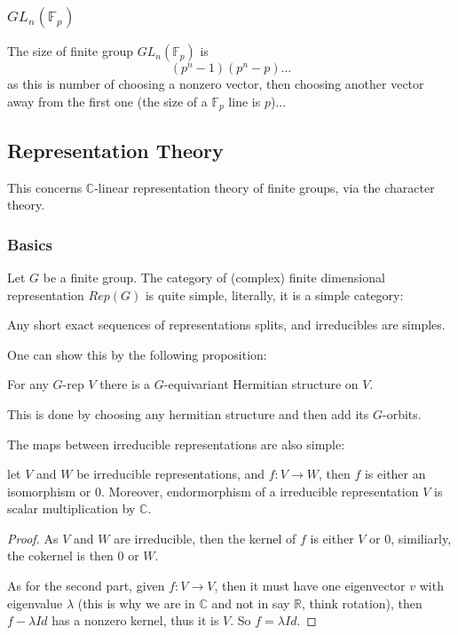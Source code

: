 \documentclass[main.tex]{subfiles}
\begin{document}
\subsubsection{$GL_n(\mathbb{F}_p)$}
The size of finite group $GL_n(\mathbb{F}_p)$ is
$$
(p^n -1) (p^n - p) ...
$$
as this is number of choosing a nonzero vector, then choosing another vector away from the first one (the size of a $\mathbb{F}_p$ line is $p$)...

\subsection{Representation Theory}
This concerns $\mathbb{C}$-linear representation theory of finite groups, via the character theory.


\subsubsection{Basics}
Let $G$ be a finite group.
The category of (complex) finite dimensional representation $Rep(G)$ is quite simple, literally, it is a simple category:

\begin{theorem}

Any short exact sequences of representations splits, and irreducibles are simples. 

\end{theorem}

One can show this by the following proposition:
\begin{proposition}
For any $G$-rep $V$ there is a $G$-equivariant Hermitian structure on $V$.
\end{proposition}
This is done by choosing any hermitian structure and then add its $G$-orbits.


The maps between irreducible representations are also simple:

\begin{theorem} 
let $V$ and $W$ be irreducible representations, and $f : V \rightarrow W$, then $f$ is either an isomorphism or 0. Moreover, endormorphism of a irreducible representation $V$ is scalar multiplication by $\mathbb{C}$.
\end{theorem}

\begin{proof}
As $V$ and $W$ are irreducible, then the kernel of $f$ is either $V$ or 0, similiarly, the cokernel is then $0$ or $W$.

As for the second part, given $f : V \rightarrow V$, then it must have one eigenvector $v$ with eigenvalue $\lambda$ (this is why we are in $\mathbb{C}$ and not in say $\mathbb{R}$, think rotation), then $f - \lambda Id$ has a nonzero kernel, thus it is $V$. So $f = \lambda Id$.
\end{proof}
\end{document}
